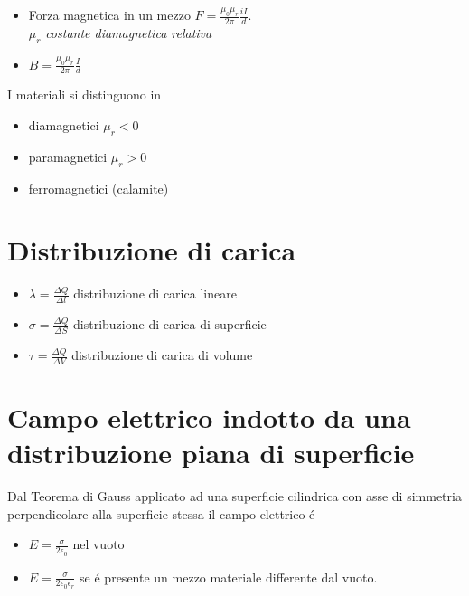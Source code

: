 \documentclass[17pt]{article}
\begin{document}

\begin{itemize}
	\item Forza magnetica in un mezzo $F = \frac{\mu_0\mu_r}{2\pi} \frac{iI}{d}$.\\ $\mu_r$ \emph{costante diamagnetica relativa}
	\item $B = \frac{\mu_0\mu_r}{2\pi} \frac{I}{d}$
\end{itemize}

I materiali si distinguono in
\begin{itemize}
	\item diamagnetici $\mu_r < 0$
	\item paramagnetici $\mu_r > 0$
	\item ferromagnetici (calamite) 
\end{itemize}









\section{Distribuzione di carica }

\begin{itemize}
	\item $\lambda = \frac{\Delta Q}{\Delta l}$ distribuzione di carica lineare
	\item $\sigma = \frac{\Delta Q}{\Delta S}$ distribuzione di carica di superficie
	\item $\tau = \frac{\Delta Q}{\Delta V}$ distribuzione di carica di volume
\end{itemize}

\section{Campo elettrico indotto da una distribuzione piana di superficie}

Dal Teorema di Gauss applicato ad una superficie cilindrica con asse di simmetria perpendicolare alla superficie stessa il campo elettrico \'e
\begin{itemize}
	\item $E = \frac{\sigma}{2\epsilon_0}$ nel vuoto
	\item $E = \frac{\sigma}{2\epsilon_0\epsilon_r}$ se \'e presente un mezzo materiale differente dal vuoto.
\end{itemize}
\end{document}

